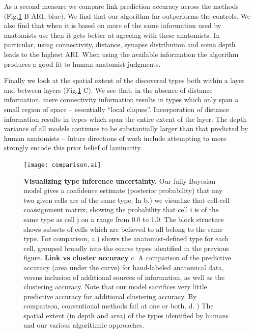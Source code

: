 \documentclass{article}
\begin{document}
As a second measure we compare link prediction accuracy across the
methods (Fig.\ref{fig:mouseretina_compare} B ARI, blue). We find that our
algorithm far outperforms the controls. We also find that when it is
based on more of the same information used by anatomists use then it
gets better at agreeing with these anatomists. In particular, using
connectivity, distance, synapse distribution and soma depth leads to
the highest ARI. When using the available information the algorithm
produces a good fit to human anatomist judgments.

Finally we look at the spatial extent of the discovered types both
within a layer and between layers (Fig.\ref{fig:mouseretina_compare}
C). We see that, in the absence of distance information, mere
connectivity information results in types which only span a small
region of space -- essentially “local cliques”. Incorporation of
distance information results in types which span the entire extent of
the layer. The depth variance of all models continues to be
substantially larger than that predicted by human anatomists -- future
directions of work include attempting to more strongly encode this
prior belief of laminarity.


\begin{figure}
  \centering 
  \centerline{\texttt{[image: comparison.ai]}}
  \caption{\textbf{Visualizing type inference uncertainty.} Our fully Bayesian model gives a confidence estimate (posterior probability) that any two given cells are of the same type. In b.) we visualize that cell-cell coassignment matrix, showing the probability that cell i is of the same type as cell j on a range from 0.0 to 1.0. The block structure shows subsets of cells which are believed to all belong to the same type. For comparison, a.) shows the anatomist-defined type for each cell, grouped broadly into the coarse types identified in the previous figure. \textbf{Link vs cluster accuracy} c. A comparison of the
    predictive accuracy (area under the curve) for hand-labeled
    anatomical data, versus inclusion of additional sources of
    information, as well as the clustering accuracy. Note that our model sacrifices very little predictive accuracy for additional clustering accuracy. By comparison, conventional methods fail at one or both.  d. ) The spatial extent (in depth and area) of the
    types identified by humans and our various algorithmic
    approaches.}

\label{fig:mouseretina_compare}
\end{figure}
\end{document}
